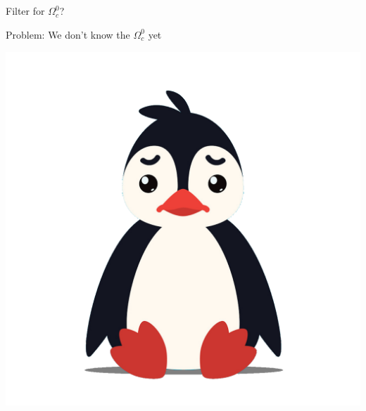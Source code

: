 \subsection{}




\begin{frame}{Filter for $\Omega_c^0$?}
\begin{minipage}[c]{0.75\textwidth}
    Problem: We don't know the $\Omega_c^0$ yet \vspace{1cm}
\end{minipage} 
\begin{minipage}[c]{0.2\textwidth}
\centering
    \includegraphics[width=\textwidth]{Figures Lecture on Datanalysis/sad-penguin3.png}
\end{minipage}\\ %
\vspace{0.5cm}%
\begin{minipage}[c]{0.2\textwidth}
\centering

\end{minipage}
\end{frame}
